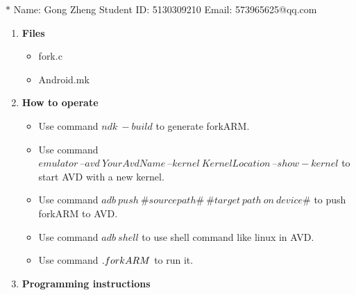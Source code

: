 \documentclass[12pt,a4paper]{article}
\newtheorem*{instruction}{Instruction}
\theoremstyle{definition}
\begin{document}
\noindent

\noindent{}
\begin{center}

\footnotesize{\color{blue}$*$ Name: Gong Zheng  \quad Student ID: 5130309210 \quad Email: 573965625@qq.com}
\end{center}
\begin{enumerate}
	\item \textbf{Files}
	\begin{itemize}
		\item fork.c
		\item Android.mk
	\end{itemize}

	\item \textbf{How to operate}
	\begin{itemize}
		\item Use command $ndk\ -build$ to generate forkARM.
		\item Use command $emulator\ –avd\ YourAvdName\ –kernel\ KernelLocation\ –show-kernel$ to start AVD with a new kernel.
		\item Use command $adb\ push\ \#source path\#\ \#target\ path\ on\ device\#$ to push forkARM to AVD.
		\item Use command $adb\ shell$ to use shell command like linux in AVD.
		\item Use command $.\/forkARM$ to run it.
	\end{itemize}

	\item \textbf{Programming instructions}

\end{enumerate}
\end{document}

